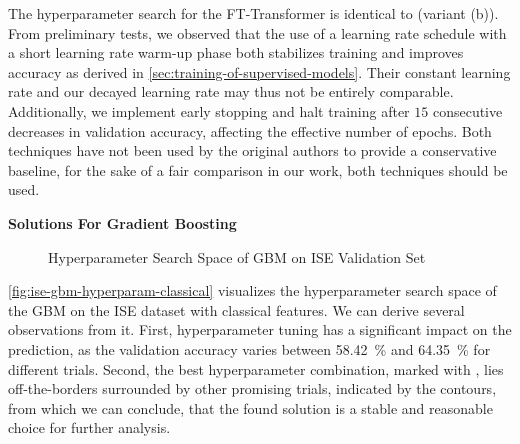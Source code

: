 The hyperparameter search for the FT-Transformer is identical to \textcite[][18]{gorishniyRevisitingDeepLearning2021} (variant (b)). From preliminary tests, we observed that the use of a learning rate schedule with a short learning rate warm-up phase both stabilizes training and improves accuracy as derived in \cref{sec:training-of-supervised-models}. Their constant learning rate and our decayed learning rate may thus not be entirely comparable. Additionally, we implement early stopping and halt training after $15$ consecutive decreases in validation accuracy, affecting the effective number of epochs. Both techniques have not been used by the original authors to provide a conservative baseline, for the sake of a fair comparison in our work, both techniques should be used.

\textbf{Solutions For Gradient Boosting}

\begin{figure}[!b]
    \vfill
\end{figure} 

\clearpage  %

\begin{figure}[ht]
        \addtocounter{figure}{-1}  %
    \caption[]{Hyperparameter Search Space of \gls{GBM} on \gls{ISE} Validation Set}
    \label{fig:ise-gbm-hyperparam}
\end{figure}
\cref{fig:ise-gbm-hyperparam-classical} visualizes the hyperparameter search space of the \gls{GBM} on the \gls{ISE} dataset with classical features. We can derive several observations from it. First, hyperparameter tuning has a significant impact on the prediction, as the validation accuracy varies between \SI{58.42}{\percent} and \SI{64.35}{\percent} for different trials. Second, the best hyperparameter combination, marked with \bestcircle, lies off-the-borders surrounded by other promising trials, indicated by the contours, from which we can conclude, that the found solution is a stable and reasonable choice for further analysis.

